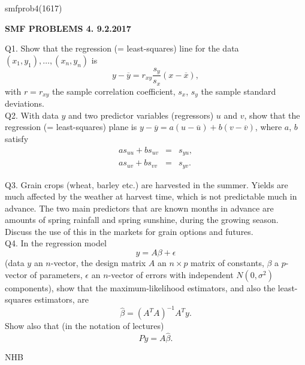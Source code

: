 \documentclass{article}
\begin{document}
\def\ni{\noindent}
\def\i{\indent}
\def\G{\Gamma}
\def\s{\sigma}
\def\t{\theta}
\def\z{\zeta}
\def\p{\partial}
\def\b{\beta}
\def\e{\epsilon}
\ni smfprob4(1617) \\
\begin{center}
{\bf SMF PROBLEMS 4.  9.2.2017}
\end{center}

\ni Q1.  Show that the regression (= least-squares) line for the data $(x_1,y_1), \ldots, (x_n,y_n)$ is
$$
y - \overline{y} = r_{xy}\frac{s_y}{s_x} (x - \overline{x}),
$$
with $r = r_{xy}$ the sample correlation coefficient, $s_x$, $s_y$ the sample standard deviations.\\

\ni Q2.  With data $y$ and two predictor variables (regressors) $u$ and $v$, show that the regression (= least-squares) plane is $y - \overline{y} = a(u - \overline{u}) + b(v - \overline{v})$, where $a$, $b$ satisfy
\begin{eqnarray*}
a s_{uu} + b s_{uv} &=& s_{yu}, \\
a s_{uv} + b s_{vv} &=& s_{yv}.
\end{eqnarray*}

\ni Q3.  Grain crops (wheat, barley etc.) are harvested in the summer.  Yields are much affected by the weather at harvest time, which is not predictable much in advance.  The two main predictors that are known months in advance are amounts of spring rainfall and spring sunshine, during the growing season.  Discuss the use of this in the markets for grain options and futures. \\

\ni Q4.  In the regression model
$$
y = A \b + \e
$$
(data $y$ an $n$-vector, the design matrix $A$ an $n \times p$ matrix of constants, $\b$ a $p$-vector of parameters, $\e$ an $n$-vector of errors with independent $N(0,{\s}^2)$ components), show that the maximum-likelihood estimators, and also the least-squares estimators, are
$$
\hat \b = (A^T A)^{-1} A^T y.
$$
\i Show also that (in the notation of lectures)
$$
Py = A \hat \beta.
$$

\hfil NHB \break
\end{document}
